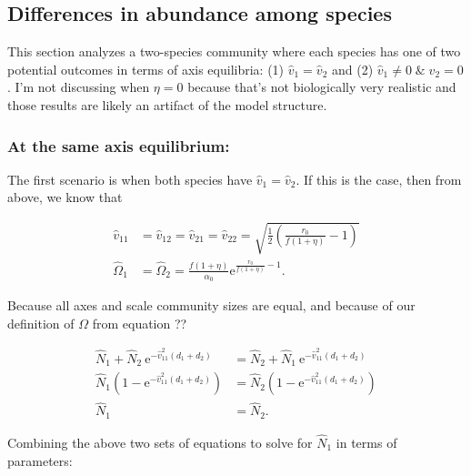 \subsection*{Differences in abundance among species}



This section analyzes a two-species community where each species has one of two potential
outcomes in terms of axis equilibria:
(1) $\hat{v}_1 = \hat{v}_2$ and
(2) $\hat{v}_1 \ne 0 \; \& \; \hat{v}_2 = 0$.
I'm not discussing when $\eta = 0$ because that's not biologically very realistic
and those results are likely an artifact of the model structure.


\subsubsection*{At the same axis equilibrium:}

The first scenario is when both species have $\hat{v}_1 = \hat{v}_2$.
If this is the case, then from above, we know that

\begin{equation*}
\begin{split}
    \hat{v}_{11} &= \hat{v}_{12} = \hat{v}_{21} = \hat{v}_{22} = \sqrt{\frac{1}{2}
        \left( \frac{r_0}{f (1 + \eta)} - 1 \right)} \\
    \hat\Omega_1 &= \hat\Omega_2 = \frac{f (1 + \eta)}{\alpha_0}
        \text{e}^{\frac{r_0}{f (1 + \eta)} - 1}
    \text{.}
\end{split}
\end{equation*}

Because all axes and scale community sizes are equal, and because of our
definition of $\Omega$ from equation ??

\begin{equation} \label{eq:two-axes-v1-v2-equal-N1-N2}
\begin{split}
    \hat{N}_1 + \hat{N}_2 \: \text{e}^{-\hat{v}_{11}^2 (d_1 + d_2)} &=
        \hat{N}_2 + \hat{N}_1 \: \text{e}^{-\hat{v}_{11}^2 (d_1 + d_2)} \\
    \hat{N}_1 \left( 1 - \text{e}^{-\hat{v}_{11}^2 (d_1 + d_2)} \right) &=
        \hat{N}_2 \left( 1 - \text{e}^{-\hat{v}_{11}^2 (d_1 + d_2)} \right) \\
    \hat{N}_1 &= \hat{N}_2
    \text{.}
\end{split}
\end{equation}

\noindent Combining the above two sets of equations to solve for $\hat{N}_1$ in
terms of parameters:


